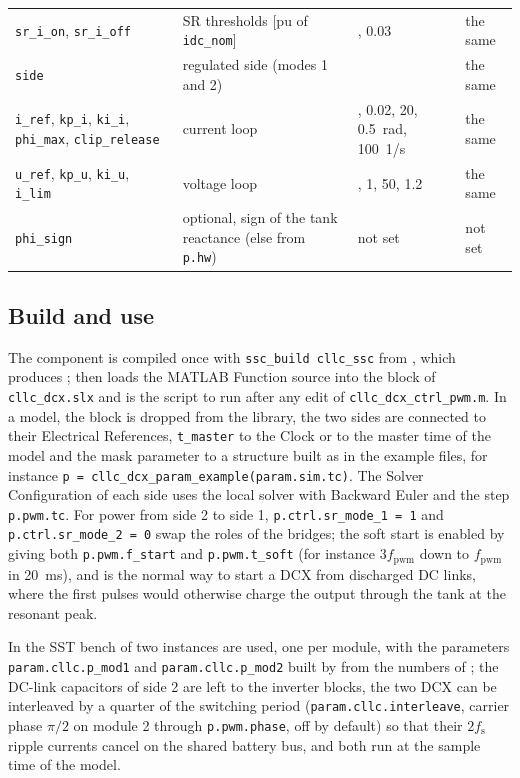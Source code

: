 \documentclass[12pt,a4paper]{scrartcl}
\newcommand{\ped}[1]{_{\mathrm{#1}}}
\newcommand{\code}[1]{\texttt{#1}}
\begin{document}
\begin{onehalfspace}
\begin{table}[H]
\begin{tabularx}{0.97\textwidth}{@{} >{\raggedright\arraybackslash}p{} X >{\raggedright\arraybackslash}p{} >{\raggedright\arraybackslash}p{} @{}}
		\code{sr\_i\_on}, \code{sr\_i\_off} & SR thresholds [pu of \code{idc\_nom}] & 0.08, 0.03 & the same \\
		\code{side} & regulated side (modes 1 and 2) & 2 & the same \\
		\code{i\_ref}, \code{kp\_i}, \code{ki\_i}, \code{phi\_max}, \code{clip\_release} & current loop & 1, 0.02, 20, \SI{0.5}{\radian}, \SI{100}{1/s} & the same \\
		\code{u\_ref}, \code{kp\_u}, \code{ki\_u}, \code{i\_lim} & voltage loop & 1, 1, 50, 1.2 & the same \\
		\code{phi\_sign} & optional, sign of the tank reactance (else from \code{p.hw}) & not set & not set \\
		\bottomrule
	\end{tabularx}
\end{table}

\subsection{Build and use}
\label{sec:use}

The component is compiled once with \code{ssc\_build cllc\_ssc} from , which produces ;  then loads the MATLAB Function source into the block of \code{cllc\_dcx.slx} and is the script to run after any edit of \code{cllc\_dcx\_ctrl\_pwm.m}. In a model, the block is dropped from the library, the two sides are connected to their Electrical References, \code{t\_master} to the Clock or to the master time of the model and the mask parameter to a structure built as in the example files, for instance \code{p = cllc\_dcx\_param\_\allowbreak example(param.sim.tc)}. The Solver Configuration of each side uses the local solver with Backward Euler and the step \code{p.pwm.tc}. For power from side 2 to side 1, \code{p.ctrl.sr\_mode\_1 = 1} and \code{p.ctrl.sr\_mode\_2 = 0} swap the roles of the bridges; the soft start is enabled by giving both \code{p.pwm.f\_start} and \code{p.pwm.t\_soft} (for instance $3 f\ped{pwm}$ down to $f\ped{pwm}$ in \SI{20}{\milli\second}), and is the normal way to start a DCX from discharged DC links, where the first pulses would otherwise charge the output through the tank at the resonant peak.

In the SST bench of \cite{sst_doc} two instances are used, one per module, with the parameters \code{param.cllc.p\_mod1} and \code{param.cllc.p\_mod2} built by  from the numbers of ; the DC-link capacitors of side 2 are left to the inverter blocks, the two DCX can be interleaved by a quarter of the switching period (\code{param.cllc.interleave}, carrier phase $\pi/2$ on module 2 through \code{p.pwm.phase}, off by default) so that their $2 f\ped{s}$ ripple currents cancel on the shared battery bus, and both run at the sample time of the model.


\end{onehalfspace}
\end{document}
